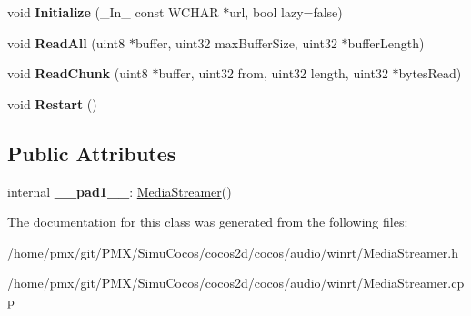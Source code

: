 \begin{DoxyCompactItemize}
\item 
\mbox{\label{classMediaStreamer_a47b1a8c8e991f1606c6a01b4fc977bc6}} 
void {\bfseries Initialize} (\+\_\+\+In\+\_\+ const W\+C\+H\+AR $\ast$url, bool lazy=false)
\item 
\mbox{\label{classMediaStreamer_a7a7bfa40fc9eb7482633cd6ff39ff1c8}} 
void {\bfseries Read\+All} (uint8 $\ast$buffer, uint32 max\+Buffer\+Size, uint32 $\ast$buffer\+Length)
\item 
\mbox{\label{classMediaStreamer_abc684e7e49628e6ecf47767f05283500}} 
void {\bfseries Read\+Chunk} (uint8 $\ast$buffer, uint32 from, uint32 length, uint32 $\ast$bytes\+Read)
\item 
\mbox{\label{classMediaStreamer_aa76aa442a90e0c7983da9419cd243639}} 
void {\bfseries Restart} ()
\end{DoxyCompactItemize}
\subsection*{Public Attributes}
\begin{DoxyCompactItemize}
\item 
\mbox{\label{classMediaStreamer_a7f8932a00f1071cbc09006f9384066c4}} 
internal {\bfseries \+\_\+\+\_\+pad1\+\_\+\+\_\+}\+: \hyperlink{classMediaStreamer}{Media\+Streamer}()
\end{DoxyCompactItemize}


The documentation for this class was generated from the following files\+:\begin{DoxyCompactItemize}
\item 
/home/pmx/git/\+P\+M\+X/\+Simu\+Cocos/cocos2d/cocos/audio/winrt/Media\+Streamer.\+h\item 
/home/pmx/git/\+P\+M\+X/\+Simu\+Cocos/cocos2d/cocos/audio/winrt/Media\+Streamer.\+cpp\end{DoxyCompactItemize}
